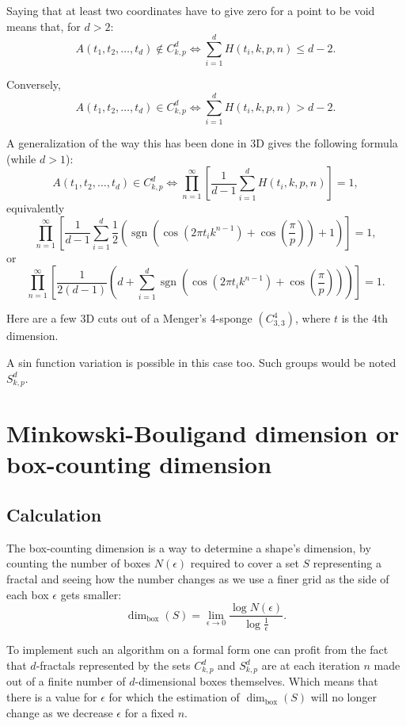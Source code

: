 \documentclass[11pt]{article}
\begin{document}
Saying that at least two coordinates have to give zero for a point to be void means that, for $d>2$:
\[
A(t_1,t_2,\dots,t_d)\notin C_{k,p}^d \iff \sum_{i=1}^d H(t_i,k,p,n)\le d-2.
\]

Conversely,
\[
A(t_1,t_2,\dots,t_d)\in C_{k,p}^d \iff \sum_{i=1}^d H(t_i,k,p,n)> d-2.
\]

A generalization of the way this has been done in 3D gives the following formula (while $d>1$):
\[
A(t_1,t_2,\dots,t_d)\in C_{k,p}^d \iff
\prod_{n=1}^{\infty}
\left[\frac{1}{d-1}\sum_{i=1}^d H(t_i,k,p,n)\right]=1,
\]
equivalently
\[
\prod_{n=1}^{\infty}
\left[\frac{1}{d-1}\sum_{i=1}^d \frac{1}{2}\left(\operatorname{sgn}\left(\cos(2\pi t_i k^{n-1})+\cos\left(\frac{\pi}{p}\right)\right)+1\right)\right]=1,
\]
or
\[
\prod_{n=1}^{\infty}
\left[\frac{1}{2(d-1)}\left(d+\sum_{i=1}^d \operatorname{sgn}\left(\cos(2\pi t_i k^{n-1})+\cos\left(\frac{\pi}{p}\right)\right)\right)\right]=1.
\]

Here are a few 3D cuts out of a Menger's 4-sponge $(C_{3,3}^4)$, where $t$ is the 4th dimension.

A sin function variation is possible in this case too. Such groups would be noted $S_{k,p}^d$.

\section{Minkowski-Bouligand dimension or box-counting dimension}

\subsection{Calculation}

The box-counting dimension is a way to determine a shape's dimension, by counting the number of boxes $N(\epsilon)$ required to cover a set $S$ representing a fractal and seeing how the number changes as we use a finer grid as the side of each box $\epsilon$ gets smaller:
\[
\dim_{\mathrm{box}}(S)=\lim_{\epsilon\to 0}\frac{\log N(\epsilon)}{\log \frac{1}{\epsilon}}.
\]

To implement such an algorithm on a formal form one can profit from the fact that $d$-fractals represented by the sets $C_{k,p}^d$ and $S_{k,p}^d$ are at each iteration $n$ made out of a finite number of $d$-dimensional boxes themselves. Which means that there is a value for $\epsilon$ for which the estimation of $\dim_{\mathrm{box}}(S)$ will no longer change as we decrease $\epsilon$ for a fixed $n$.
\end{document}
